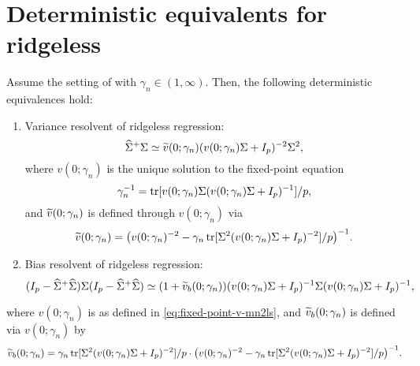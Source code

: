 \documentclass{article}
\begin{document}
\section{Deterministic equivalents for ridgeless}

\begin{lemma}
    \label{lem:deter-approx-generalized-ridgeless}
    Assume the setting of 
    with $\gamma_n \in (1, \infty)$.
    Then,
    the following deterministic equivalences hold:
    \begin{enumerate}
        \item Variance resolvent of ridgeless regression:
        \begin{equation}
            \label{eq:detequi-mn2ls-genbias}
            {\widehat{\Sigma}}^{+} \Sigma
            \simeq
            \widetilde{v}(0; \gamma_n)
            (v(0; \gamma_n) \Sigma + I_p)^{-2} \Sigma^2,
        \end{equation}
        where $v(0; \gamma_n)$ is the unique solution
        to the fixed-point equation
        \begin{equation}
            \label{eq:fixed-point-v-mn2ls}
            \gamma_n^{-1}
            = \operatorname{tr}[v(0; \gamma_n) \Sigma (v(0; \gamma_n) \Sigma + I_p)^{-1}] / p,
        \end{equation}
        and $\widetilde{v}(0; \gamma_n)$ is defined through $v(0; \gamma_n)$  via
        \begin{equation}
            \label{eq:def-vg-mn2ls-tv}
            \widetilde{v}(0; \gamma_n)
            = \big( v(0; \gamma_n)^{-2} - \gamma_n \operatorname{tr}[\Sigma^2 (v(0; \gamma_n) \Sigma + I_p)^{-2}] / p \big)^{-1}.
        \end{equation}
        \item Bias resolvent of ridgeless regression:
        \begin{equation}
            (I_p - {\widehat{\Sigma}}^{+} {\widehat{\Sigma}})
            \Sigma
            (I_p - {\widehat{\Sigma}}^{+} {\widehat{\Sigma}})
            \simeq
            (1 + \widetilde{v}_b(0; \gamma_n))
            (v(0; \gamma_n) \Sigma + I_p)^{-1}
            \Sigma
            (v(0; \gamma_n) \Sigma + I_p)^{-1},
        \end{equation}
    \end{enumerate}
\end{lemma}
where $v(0; \gamma_n)$ is as defined in \eqref{eq:fixed-point-v-mn2ls},
and $\widetilde{v}_b(0; \gamma_n)$ is defined via $v(0; \gamma_n)$ by
\begin{equation}
    \label{eq:def-tv-mn2ls-tvg}
    \widetilde{v}_b(0; \gamma_n)
    =
    \gamma_n
    \operatorname{tr}[\Sigma^2 (v(0; \gamma_n) \Sigma + I_p)^{-2}] / p
    \cdot
    \big(v(0; \gamma_n)^{-2} - \gamma_n \operatorname{tr}[\Sigma^2 (v(0; \gamma_n) \Sigma + I_p)^{-2}] / p\big)^{-1}.
\end{equation}
\end{document}
